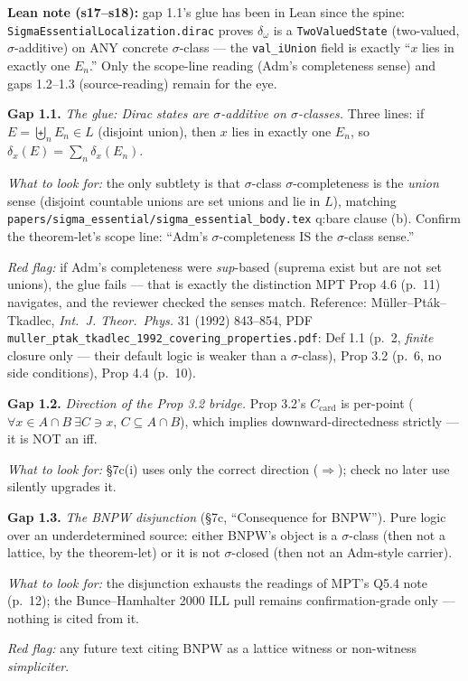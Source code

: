 \documentclass[11pt]{article}
\newcommand{\file}[1]{\texttt{\small #1}}
\newcommand{\gap}[1]{\medskip\noindent\textbf{Gap #1.}}
\newcommand{\lookfor}{\par\smallskip\noindent\emph{What to look for:} }
\newcommand{\redflag}{\par\smallskip\noindent\emph{Red flag:} }
\begin{document}
\smallskip\noindent\textbf{Lean note (s17--s18):} gap 1.1's glue has
been in Lean since the spine: \texttt{SigmaEssentialLocalization.dirac}
proves $\delta_\omega$ is a \texttt{TwoValuedState} (two-valued,
$\sigma$-additive) on ANY concrete $\sigma$-class --- the
\texttt{val\_iUnion} field is exactly ``$x$ lies in exactly one
$E_n$.'' Only the scope-line reading (Adm's completeness sense) and
gaps 1.2--1.3 (source-reading) remain for the eye.

\gap{1.1} \emph{The glue: Dirac states are $\sigma$-additive on
$\sigma$-classes.} Three lines: if $E = \biguplus_n E_n \in L$
(disjoint union), then $x$ lies in exactly one $E_n$, so
$\delta_x(E) = \sum_n \delta_x(E_n)$.
\lookfor the only subtlety is that $\sigma$-class
$\sigma$-completeness is the \emph{union} sense (disjoint countable
unions are set unions and lie in $L$), matching
\file{papers/sigma\_essential/sigma\_essential\_body.tex} q:bare clause (b). Confirm the
theorem-let's scope line: ``Adm's $\sigma$-completeness IS the
$\sigma$-class sense.''
\redflag if Adm's completeness were \emph{sup}-based (suprema exist
but are not set unions), the glue fails --- that is exactly the
distinction MPT Prop 4.6 (p.~11) navigates, and the reviewer checked
the senses match. Reference: M\"uller--Pt\'ak--Tkadlec, \emph{Int.\ J.
Theor.\ Phys.} 31 (1992) 843--854, PDF
\file{muller\_ptak\_tkadlec\_1992\_covering\_properties.pdf}: Def
1.1 (p.~2, \emph{finite} closure only --- their default logic is
weaker than a $\sigma$-class), Prop 3.2 (p.~6, no side conditions),
Prop 4.4 (p.~10).

\gap{1.2} \emph{Direction of the Prop 3.2 bridge.} Prop 3.2's
$C_{\mathrm{card}}$ is per-point ($\forall x \in A\cap B\ \exists C
\ni x$, $C \subseteq A \cap B$), which implies downward-directedness
strictly --- it is NOT an iff.
\lookfor \S7c(i) uses only the correct direction
($\Rightarrow$); check no later use silently upgrades it.

\gap{1.3} \emph{The BNPW disjunction} (\S7c, ``Consequence for
BNPW''). Pure logic over an underdetermined source: either BNPW's
object is a $\sigma$-class (then not a lattice, by the theorem-let)
or it is not $\sigma$-closed (then not an Adm-style carrier).
\lookfor the disjunction exhausts the readings of MPT's Q5.4 note
(p.~12); the Bunce--Hamhalter 2000 ILL pull remains
confirmation-grade only --- nothing is cited from it.
\redflag any future text citing BNPW as a lattice witness or
non-witness \emph{simpliciter}.

\end{document}
